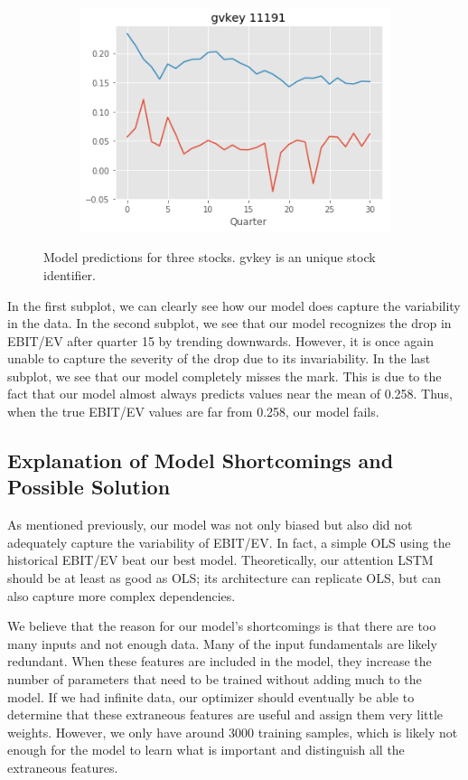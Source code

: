 \documentclass[11pt, letterpaper, headings=standardclasses]{scrartcl}
\begin{document}
\begin{figure}[H]
\begin{subfigure}{.33\textwidth}
      \centering
      \includegraphics[width=1\linewidth]{stock3.png}
    \end{subfigure}
    \caption{Model predictions for three stocks. gvkey is an unique stock identifier.}
    \label{fig:test}
    \end{figure}
    
    In the first subplot, we can clearly see how our model does capture the variability in the data. In the second subplot, we see that our model recognizes the drop in EBIT/EV after quarter 15 by trending downwards. However, it is once again unable to capture the severity of the drop due to its invariability. In the last subplot, we see that our model completely misses the mark. This is due to the fact that our model almost always predicts values near the mean of 0.258. Thus, when the true EBIT/EV values are far from 0.258, our model fails.
    
    \subsection{Explanation of Model Shortcomings and Possible Solution}
    As mentioned previously, our model was not only biased but also did not adequately capture the variability of EBIT/EV. In fact, a simple OLS using the historical EBIT/EV beat our best model. Theoretically, our attention LSTM should be at least as good as OLS; its architecture can replicate OLS, but can also capture more complex dependencies.
    
    We believe that the reason for our model's shortcomings is that there are too many inputs and not enough data. Many of the input fundamentals are likely redundant. When these features are included in the model, they increase the number of parameters that need to be trained without adding much to the model. If we had infinite data, our optimizer should eventually be able to determine that these extraneous features are useful and assign them very little weights. However, we only have around 3000 training samples, which is likely not enough for the model to learn what is important and distinguish all the extraneous features. 
    
\end{document}
